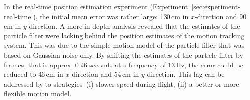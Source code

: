 In the real-time position estimation experiment (Experiment~\ref{sec:experiment-real-time}), the initial mean error was rather large: 130\,cm in $x$-direction and 90\,cm in $y$-direction. A more in-depth analysis revealed that the estimates of the particle filter were lacking behind the position estimates of the motion tracking system. This was due to the simple motion model of the particle filter that was based on Gaussian noise only. By shifting the estimates of the particle filter by frames, that is approx. 0.46 seconds at a frequency of 13\,Hz, the error could be reduced to 46\,cm in $x$-direction and 54\,cm in $y$-direction. This lag can be addressed by to strategies: (i) slower speed during flight, (ii) a better or more flexible motion model. 